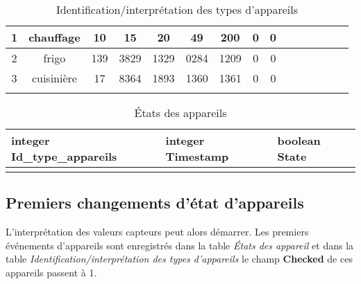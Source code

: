 \documentclass[10pt,a4paper]{article}
\begin{document}
\begin{table}[h]
{\begin{tabular}{|c|c|c|c|c|c|c|c|c|c|c|c|c|c|c|}
1 & chauffage & 10 & 15 & 20 & 49 & 200 & 0 & 0 &  &  &  &  &  &  \\ \hline
2 & frigo & 139 & 3829 & 1329 & 0284 & 1209 & 0 & 0 &  &  &  &  &  &  \\ \hline
3 & cuisinière & 17 & 8364 & 1893 & 1360 & 1361 & 0 & 0  &  &  &  &  &  &  \\ \hline
 &  &  &  &  &  &  &  &  &  &  &  &  &  & 
\end{tabular}
}
\caption{Identification/interprétation des types d'appareils}
\end{table}
\begin{table}[h!]
\centering
    \begin{tabular}{|l|l|l|}
    \hline
    \rowcolor[HTML]{EFEFEF} 
    integer Id\_type\_appareils & integer Timestamp & boolean State \\ \hline                 &                   &              
    \end{tabular}
    \caption{États des appareils}
\end{table}
\newpage
\subsection{Premiers changements d'état d'appareils}
L'interprétation des valeurs capteurs peut alors démarrer. Les premiers événements d'appareils sont enregistrés dans la table \textit{États des appareil} et dans la table \textit{Identification/interprétation des types d'appareils} le champ \textbf{Checked} de ces appareils passent à 1. \\
\end{document}
